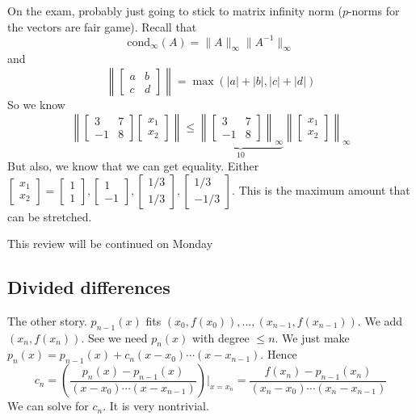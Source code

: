 \documentclass{article}
\theoremstyle{plain}
\theoremstyle{remark}
\begin{document}
On the exam, probably just going to stick to matrix infinity norm
($p$-norms for the vectors are fair game).
Recall that
\[
	\mathrm{cond}_\infty(A) = \lVert A \rVert_\infty \lVert A^{-1} \rVert_\infty
\]
and
\[
	\left\lVert \begin{bmatrix} a & b \\ c & d \end{bmatrix} \right\rVert
	= \max\left(|a| + |b|, |c| + |d| \right)
\]
So we know
\[
	\left\lVert \begin{bmatrix} 3 & 7 \\ -1 & 8 \end{bmatrix}
	\begin{bmatrix} x_1 \\ x_2 \end{bmatrix} \right\rVert
	\leq \underbrace{\left\lVert \begin{bmatrix} 3 & 7 \\
	-1 & 8 \end{bmatrix} \right\rVert_\infty}_{10}
	\left\lVert \begin{bmatrix} x_1 \\ x_2 \end{bmatrix} \right\rVert_\infty
\]
But also, we know that we can get equality.
Either $\begin{bmatrix} x_1 \\ x_2 \end{bmatrix}
= \begin{bmatrix} 1 \\ 1 \end{bmatrix}, \begin{bmatrix} 1 \\ -1 \end{bmatrix},
\begin{bmatrix} 1/3 \\ 1/3 \end{bmatrix}, \begin{bmatrix} 1/3 \\ -1/3 \end{bmatrix}$.
This is the maximum amount that can be stretched.

This review will be continued on Monday

\subsection{Divided differences}
The other story.
$p_{n-1}(x)$ fits $(x_0,f(x_0)),\dots,(x_{n-1},f(x_{n-1}))$.
We add $(x_n,f(x_n))$.
See we need $p_n(x)$ with degree $\leq n$.
We just make $p_n(x) = p_{n-1}(x) + c_n(x-x_0)\cdots(x-x_{n-1})$.
Hence
\[
	c_n = \left(\frac{p_n(x) - p_{n-1}(x)}{(x-x_0)\cdots(x-x_{n-1})}\right) \bigg\vert_{x=x_n}
	= \frac{f(x_n) - p_{n-1}(x_n)}{(x_n-x_0)\cdots(x_n-x_{n-1})}
\]
We can solve for $c_n$. It is very nontrivial.
\end{document}
